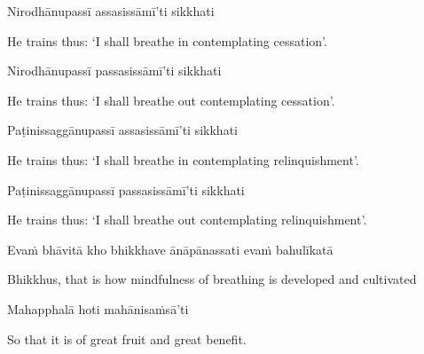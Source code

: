 Nirodhānupassī assasissāmī'ti sikkhati

\begin{english}
  He trains thus: `I shall breathe in contemplating cessation'.
\end{english}

Nirodhānupassī passasissāmī'ti sikkhati

\begin{english}
  He trains thus: `I shall breathe out contemplating cessation'.
\end{english}

Paṭinissaggānupassī assasissāmī'ti sikkhati

\begin{english}
  He trains thus: `I shall breathe in contemplating relinquishment'.
\end{english}

Paṭinissaggānupassī passasissāmī'ti sikkhati

\begin{english}
  He trains thus: `I shall breathe out contemplating relinquishment'.
\end{english}

Evaṁ bhāvitā kho bhikkhave ānāpānassati evaṁ bahulīkatā

\begin{english}
  Bhikkhus, that is how mindfulness of breathing is developed and cultivated
\end{english}

Mahapphalā hoti mahānisaṁsā'ti

\begin{english}
  So that it is of great fruit and great benefit.
\end{english}


